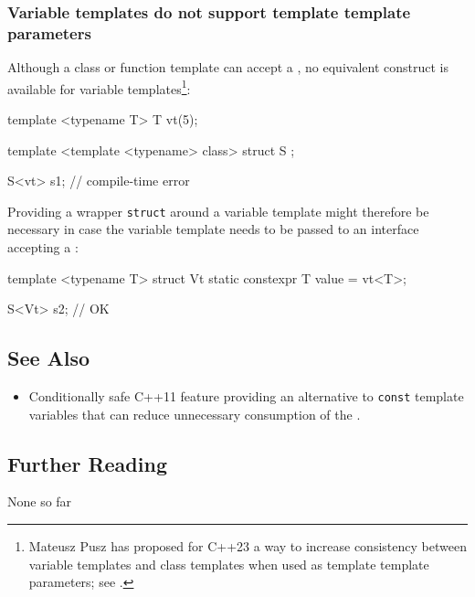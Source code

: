 \subsubsection[Variable templates do not support template template parameters]{Variable templates do not support template template parameters}\label{variable-templates-do-not-support-template-template-parameters}

Although a class or function template can accept a
, no equivalent
construct is available for variable templates{\cprotect\footnote{Mateusz Pusz has proposed for C++23 a way to increase consistency between
variable templates and class templates when used as template template
  parameters; see \cite{pusz20}.}}:

\begin{emcppslisting}[language=C++]
template <typename T> T vt(5);

template <template <typename> class>
struct S { };

S<vt> s1;  // compile-time error
\end{emcppslisting}
    
\noindent Providing a wrapper \lstinline!struct!
around a variable template might therefore be necessary in case the variable template needs to be passed to an interface
accepting a :

\begin{emcppslisting}[language=C++]
template <typename T>
struct Vt { static constexpr T value = vt<T>; }

S<Vt> s2;  // OK
\end{emcppslisting}
    

\subsection[See Also]{See Also}\label{see-also}

\begin{itemize}
\item{%
Conditionally safe C++11 feature providing an alternative to \lstinline!const! template variables that can reduce unnecessary consumption of the .}
\end{itemize}

\subsection[Further Reading]{Further Reading}\label{further-reading}

None so far


